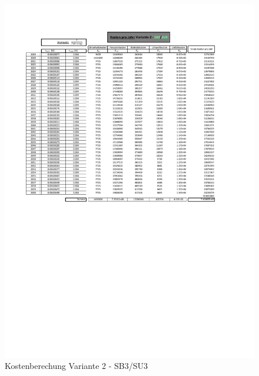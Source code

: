 \begin{figure}[h!]
	\centering
	\includegraphics[width=\textwidth]{figures/Anhang/f-00-A-V2-B3-U3}
	\caption{Kostenberechung Variante 2 - SB3/SU3}
\end{figure}

